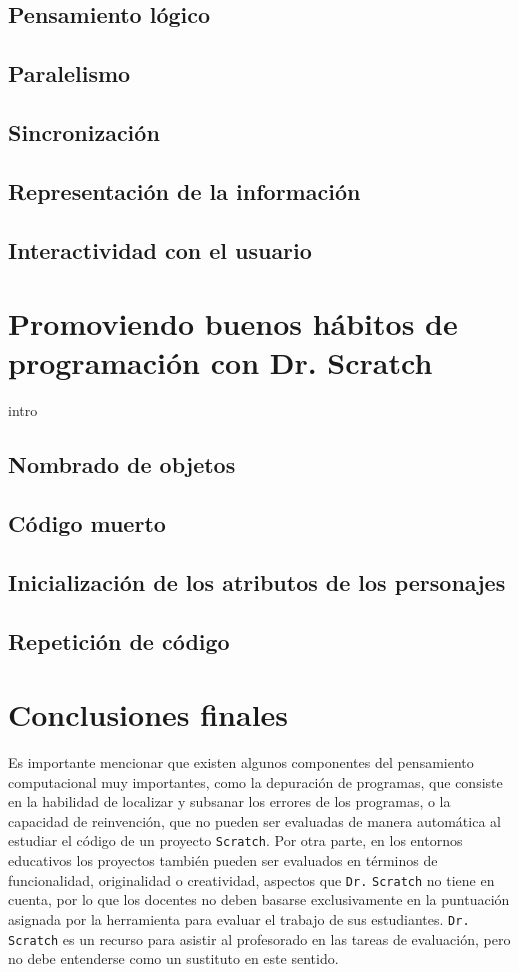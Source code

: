 \documentclass[a4paper,10pt]{article}
\begin{document}
\subsection{Pensamiento lógico}
\subsection{Paralelismo}
\subsection{Sincronización}
\subsection{Representación de la información}
\subsection{Interactividad con el usuario}

\section{Promoviendo buenos hábitos de programación con Dr. Scratch}
intro
\subsection{Nombrado de objetos}
\subsection{Código muerto}
\subsection{Inicialización de los atributos de los personajes}
\subsection{Repetición de código}

\section{Conclusiones finales}
Es importante mencionar que existen algunos componentes del pensamiento computacional muy importantes, como la depuración de programas, que consiste en la habilidad de localizar y subsanar los errores de los programas, o la capacidad de reinvención, que no pueden ser evaluadas de manera automática al estudiar el código de un proyecto \texttt{Scratch}. Por otra parte, en los entornos educativos los proyectos también pueden ser evaluados en términos de funcionalidad, originalidad o creatividad, aspectos que \texttt{Dr.}{\tiny{ }}\texttt{Scratch} no tiene en cuenta, por lo que los docentes no deben basarse exclusivamente en la puntuación asignada por la herramienta para evaluar el trabajo de sus estudiantes. \texttt{Dr.}{\tiny{ }}\texttt{Scratch} es un recurso para asistir al profesorado en las tareas de evaluación, pero no debe entenderse como un sustituto en este sentido.
\end{document}
